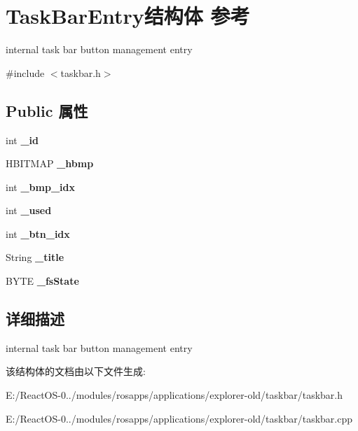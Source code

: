 \hypertarget{struct_task_bar_entry}{}\section{Task\+Bar\+Entry结构体 参考}
\label{struct_task_bar_entry}


internal task bar button management entry  




{\ttfamily \#include $<$taskbar.\+h$>$}

\subsection*{Public 属性}
\begin{DoxyCompactItemize}
\item 
\mbox{\label{struct_task_bar_entry_a9bd0e80484a7450bd35a0b69c58c51ad}} 
int {\bfseries \+\_\+id}
\item 
\mbox{\label{struct_task_bar_entry_a05e6cd2a93046b96b0453565a5077015}} 
H\+B\+I\+T\+M\+AP {\bfseries \+\_\+hbmp}
\item 
\mbox{\label{struct_task_bar_entry_a83ef300494115a2d273b12a6bfaee2cf}} 
int {\bfseries \+\_\+bmp\+\_\+idx}
\item 
\mbox{\label{struct_task_bar_entry_ab5248db6c4406e9ee7261aefc4910067}} 
int {\bfseries \+\_\+used}
\item 
\mbox{\label{struct_task_bar_entry_abf266d96cd61d20999542f86dd9584f3}} 
int {\bfseries \+\_\+btn\+\_\+idx}
\item 
\mbox{\label{struct_task_bar_entry_acb8f2f9bf8a68e375b0dabc35cf06cd4}} 
String {\bfseries \+\_\+title}
\item 
\mbox{\label{struct_task_bar_entry_aa5727fdb6ff48cd049cdb445c219742e}} 
B\+Y\+TE {\bfseries \+\_\+fs\+State}
\end{DoxyCompactItemize}


\subsection{详细描述}
internal task bar button management entry 

该结构体的文档由以下文件生成\+:\begin{DoxyCompactItemize}
\item 
E\+:/\+React\+O\+S-\/0../modules/rosapps/applications/explorer-\/old/taskbar/taskbar.\+h\item 
E\+:/\+React\+O\+S-\/0../modules/rosapps/applications/explorer-\/old/taskbar/taskbar.\+cpp\end{DoxyCompactItemize}
